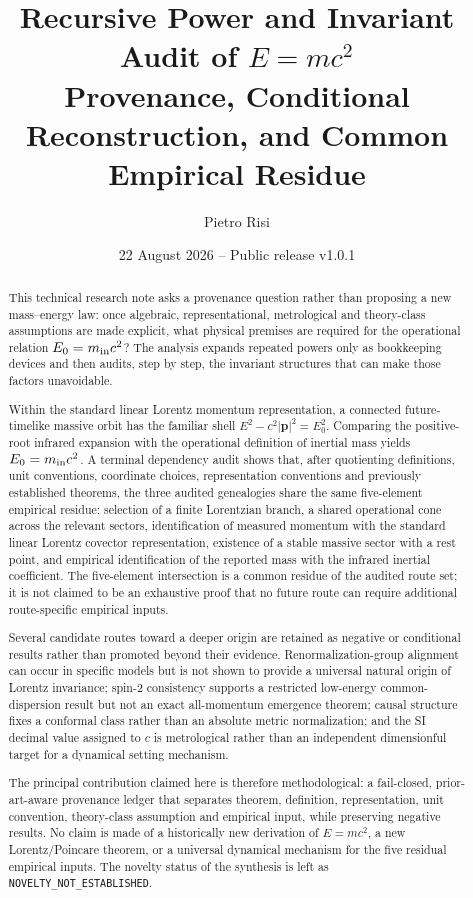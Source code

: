 \documentclass[11pt,a4paper]{article}
\title{\bfseries Recursive Power and Invariant Audit of \texorpdfstring{$E=mc^2$}{E=mc2}\\[0.25em]
\large Provenance, Conditional Reconstruction, and Common Empirical Residue}
\author{Pietro Risi}
\date{22 August 2026 \quad -- \quad Public release v1.0.1}
\begin{document}
\maketitle

\begin{abstract}
This technical research note asks a provenance question rather than proposing a new mass--energy law: once algebraic, representational, metrological and theory-class assumptions are made explicit, what physical premises are required for the operational relation $E_0=m_{\rm in}c^2$?  The analysis expands repeated powers only as bookkeeping devices and then audits, step by step, the invariant structures that can make those factors unavoidable.

Within the standard linear Lorentz momentum representation, a connected future-timelike massive orbit has the familiar shell $E^2-c^2|\mathbf p|^2=E_0^2$.  Comparing the positive-root infrared expansion with the operational definition of inertial mass yields $E_0=m_{\rm in}c^2$.  A terminal dependency audit shows that, after quotienting definitions, unit conventions, coordinate choices, representation conventions and previously established theorems, the three audited genealogies share the same five-element empirical residue: selection of a finite Lorentzian branch, a shared operational cone across the relevant sectors, identification of measured momentum with the standard linear Lorentz covector representation, existence of a stable massive sector with a rest point, and empirical identification of the reported mass with the infrared inertial coefficient.  The five-element intersection is a common residue of the audited route set; it is not claimed to be an exhaustive proof that no future route can require additional route-specific empirical inputs.

Several candidate routes toward a deeper origin are retained as negative or conditional results rather than promoted beyond their evidence.  Renormalization-group alignment can occur in specific models but is not shown to provide a universal natural origin of Lorentz invariance; spin-2 consistency supports a restricted low-energy common-dispersion result but not an exact all-momentum emergence theorem; causal structure fixes a conformal class rather than an absolute metric normalization; and the SI decimal value assigned to $c$ is metrological rather than an independent dimensionful target for a dynamical setting mechanism.

The principal contribution claimed here is therefore methodological: a fail-closed, prior-art-aware provenance ledger that separates theorem, definition, representation, unit convention, theory-class assumption and empirical input, while preserving negative results.  No claim is made of a historically new derivation of $E=mc^2$, a new Lorentz/Poincare theorem, or a universal dynamical mechanism for the five residual empirical inputs.  The novelty status of the synthesis is left as \texttt{NOVELTY\_NOT\_ESTABLISHED}.
\end{abstract}
\end{document}
